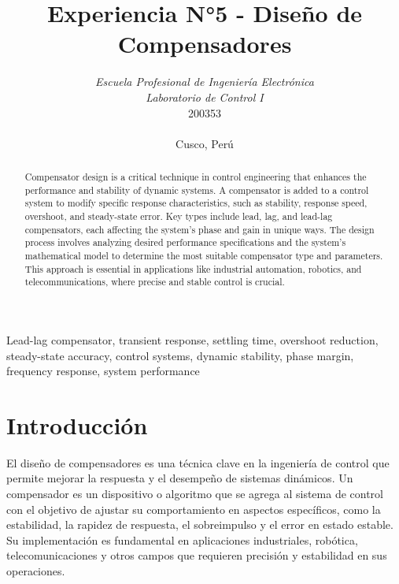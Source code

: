 \documentclass[conference]{IEEEtran}
\begin{document}
	
	\title{Experiencia N°5 - Diseño de Compensadores}
	\author{	
		\textit{Escuela Profesional de Ingeniería Electrónica}\\
		\textit{Laboratorio de Control I}\\
		200353 \\\\
		Cusco, Perú
	}
	
	\maketitle
	
	\begin{abstract}
		Compensator design is a critical technique in control engineering that enhances the performance and stability of dynamic systems. A compensator is added to a control system to modify specific response characteristics, such as stability, response speed, overshoot, and steady-state error. Key types include lead, lag, and lead-lag compensators, each affecting the system's phase and gain in unique ways. The design process involves analyzing desired performance specifications and the system's mathematical model to determine the most suitable compensator type and parameters. This approach is essential in applications like industrial automation, robotics, and telecommunications, where precise and stable control is crucial.
	\end{abstract}
	
	\begin{IEEEkeywords}
		Lead-lag compensator, transient response, settling time, overshoot reduction, steady-state accuracy, control systems, dynamic stability, phase margin, frequency response, system performance
	\end{IEEEkeywords}
	
	\section{Introducción}
	El diseño de compensadores es una técnica clave en la ingeniería de control que permite mejorar la respuesta y el desempeño de sistemas dinámicos. Un compensador es un dispositivo o algoritmo que se agrega al sistema de control con el objetivo de ajustar su comportamiento en aspectos específicos, como la estabilidad, la rapidez de respuesta, el sobreimpulso y el error en estado estable. Su implementación es fundamental en aplicaciones industriales, robótica, telecomunicaciones y otros campos que requieren precisión y estabilidad en sus operaciones.
	
\end{document}
